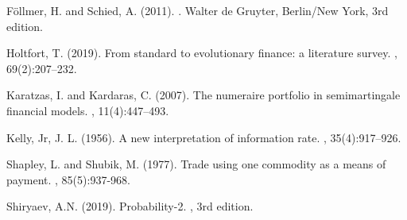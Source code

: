 \documentclass[a4paper,12pt,russian]{article} %
\theoremstyle{definition}
\begin{document}
\begin{thebibliography}{}
 Föllmer, H. and Schied, A. (2011). 
. Walter de Gruyter, Berlin/New York, 3rd edition.


 Holtfort, T. (2019). 
\newblock From standard to evolutionary finance: a literature survey. 
, 69(2):207–232.


 Karatzas, I. and Kardaras, C. (2007). 
\newblock The numeraire portfolio in semimartingale financial models. 
, 11(4):447–493.


 Kelly, Jr, J. L. (1956). 
\newblock A new interpretation of information rate. 
, 35(4):917–926.

 Shapley, L. and Shubik, M. (1977). 
\newblock Trade using one commodity as a means of payment.
, 
    85(5):937-968.

 Shiryaev, A.N. (2019). 
\newblock Probability-2.
, 
    3rd edition.
  
\end{thebibliography}
\end{document}
